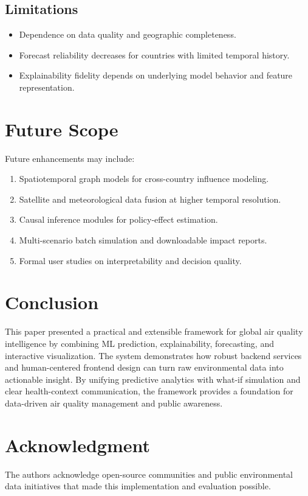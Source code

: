 \documentclass[12pt,a4paper]{article}
\begin{document}
\subsection{Limitations}
\begin{itemize}[leftmargin=*]
    \item Dependence on data quality and geographic completeness.
    \item Forecast reliability decreases for countries with limited temporal history.
    \item Explainability fidelity depends on underlying model behavior and feature representation.
\end{itemize}

\section{Future Scope}
Future enhancements may include:
\begin{enumerate}[leftmargin=*]
    \item Spatiotemporal graph models for cross-country influence modeling.
    \item Satellite and meteorological data fusion at higher temporal resolution.
    \item Causal inference modules for policy-effect estimation.
    \item Multi-scenario batch simulation and downloadable impact reports.
    \item Formal user studies on interpretability and decision quality.
\end{enumerate}

\section{Conclusion}
This paper presented a practical and extensible framework for global air quality intelligence by combining ML prediction, explainability, forecasting, and interactive visualization. The system demonstrates how robust backend services and human-centered frontend design can turn raw environmental data into actionable insight. By unifying predictive analytics with what-if simulation and clear health-context communication, the framework provides a foundation for data-driven air quality management and public awareness.

\section*{Acknowledgment}
The authors acknowledge open-source communities and public environmental data initiatives that made this implementation and evaluation possible.
\end{document}
